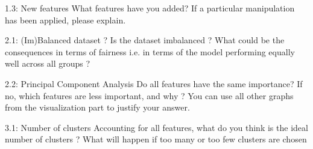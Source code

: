 \documentclass [a4paper, 12pt] {article}
\begin{document}
\begin{question}{1.3: New features}
    What features have you added? If a particular manipulation has been applied, please explain.
\end{question}
\begin{answer}\color{blue} 
\end{answer}

\begin{question}{2.1: (Im)Balanced dataset ?}
Is the dataset imbalanced ? What could be the consequences in terms of fairness i.e. in terms of the model performing equally well across all groups ?
\end{question}
\begin{answer}\color{blue} 
\end{answer}

\begin{question}{2.2: Principal Component Analysis}
Do all features have the same importance? If no, which features are less important, and why ? You can use all other graphs from the visualization part to justify your answer.
\end{question}
\begin{answer}\color{blue}
\end{answer}

\begin{question}{3.1: Number of clusters}
Accounting for all features, what do you think is the ideal number of clusters ? What will happen if too many or too few clusters are chosen
\end{question}
\begin{answer} \color{blue}
\end{answer}
\end{document}
